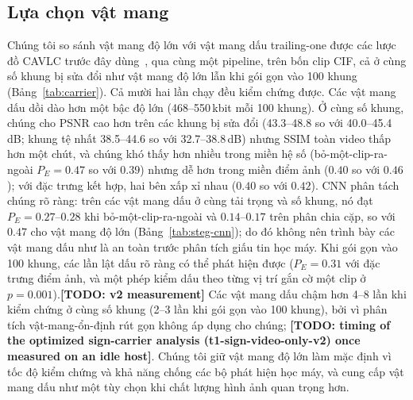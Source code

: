 \documentclass[journal]{IEEEtran}
\newcommand{\todo}[1]{\textbf{[TODO: #1]}}
\begin{document}



\subsection{Lựa chọn vật mang}
\label{sec:carrier}
Chúng tôi so sánh vật mang độ lớn với vật mang dấu trailing-one được các lược
đồ CAVLC trước đây dùng~\cite{ref:liao12}, qua cùng một pipeline, trên bốn clip
CIF, cả ở cùng số khung bị sửa đổi như vật mang độ lớn lẫn khi gói gọn vào 100
khung (Bảng~\ref{tab:carrier}). Cả mười hai lần chạy đều kiểm chứng được. Các
vật mang dấu dồi dào hơn một bậc độ lớn (468--550\,kbit mỗi 100 khung). Ở cùng
số khung, chúng cho PSNR cao hơn trên các khung bị sửa đổi (43.3--48.8 so với
40.0--45.4\,dB; khung tệ nhất 38.5--44.6 so với 32.7--38.8\,dB) nhưng SSIM toàn
video thấp hơn một chút, và chúng khó thấy hơn nhiều trong miền hệ số
(bỏ-một-clip-ra-ngoài $P_E=0.47$ so với $0.39$) nhưng dễ hơn trong miền điểm ảnh
($0.40$ so với $0.46$); với đặc trưng kết hợp, hai bên xấp xỉ nhau ($0.40$ so
với $0.42$). CNN phân tách chúng rõ ràng: trên các vật mang dấu ở cùng tải trọng
và số khung, nó đạt $P_E=0.27$--$0.28$ khi bỏ-một-clip-ra-ngoài và
$0.14$--$0.17$ trên phân chia cặp, so với $0.47$ cho vật mang độ lớn
(Bảng~\ref{tab:steg-cnn}); do đó không nên trình bày các vật mang dấu như là an
toàn trước phân tích giấu tin học máy. Khi gói gọn vào 100 khung, các lần lật
dấu rõ ràng có thể phát hiện được ($P_E=0.31$ với đặc trưng điểm ảnh, và một
phép kiểm dấu theo từng vị trí gắn cờ một clip ở $p=0.001$).\todo{v2 measurement} Các vật mang dấu
chậm hơn 4--8 lần khi kiểm chứng ở cùng số khung (2--3 lần khi gói gọn vào 100
khung), bởi vì phân tích vật-mang-ổn-định rút gọn không áp dụng cho chúng;
\todo{timing of the optimized sign-carrier analysis
(t1-sign-video-only-v2) once measured on an idle host}. Chúng tôi giữ vật mang
độ lớn làm mặc định vì tốc độ kiểm chứng và khả năng chống các bộ phát hiện học
máy, và cung cấp vật mang dấu như một tùy chọn khi chất lượng hình ảnh quan
trọng hơn.


\end{document}
